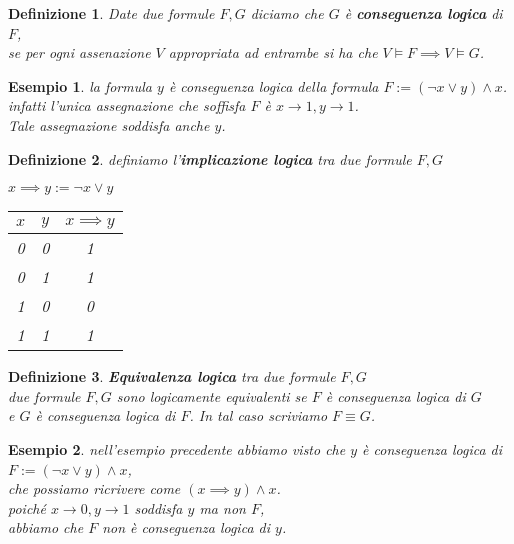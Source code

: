 \documentclass[a4paper,12pt]{article}
\theoremstyle{def}
\newtheorem*{definition}{Definizione}
\theoremstyle{prop}
\theoremstyle{esempio}
\newtheorem*{example}{Esempio}
\theoremstyle{dimostrazione}
\theoremstyle{teo}
\theoremstyle{osservazione}
\begin{document}
\begin{definition}
	Date due formule \(F,G\) diciamo che \(G\) è \textbf{conseguenza logica} di \(F\),\\
	se per ogni assenazione \(V\) appropriata ad entrambe si ha che \(V \vDash F \implies V \vDash G\).
\end{definition}
\begin{example}
	la formula \(y\) è conseguenza logica della formula \(F := (\neg x \lor y) \land x\).\\
	infatti l'unica assegnazione che soffisfa \(F\) è \(x \rightarrow 1, y \rightarrow 1\).\\
	Tale assegnazione soddisfa anche \(y\).
\end{example}
\begin{definition}
	definiamo l'\textbf{implicazione logica} tra due formule \(F,G\)\\
	\begin{center}
		\(x \implies y := \neg x \lor y\)\\
		\begin{tabular}{c|c|c}
			\hline
			\(x\) & \(y\) & \(x \implies y\) \\
			\hline
			0     & 0     & 1                \\
			0     & 1     & 1                \\
			1     & 0     & 0                \\
			1     & 1     & 1                \\
		\end{tabular}
	\end{center}
\end{definition}
\begin{definition}
	\textbf{Equivalenza logica} tra due formule \(F,G\)\\
	due formule \(F,G\) sono logicamente equivalenti se \(F\) è conseguenza logica di \(G\)\\
	e \(G\) è conseguenza logica di \(F\). In tal caso scriviamo \(F \equiv G\).
\end{definition}
\begin{example}
	nell'esempio precedente abbiamo visto che \(y\) è conseguenza logica di \(F:= (\neg x \lor y) \land x \),\\
	che possiamo ricrivere come \((x \implies y) \land x\).\\
	poiché \(x \rightarrow 0, y \rightarrow 1\) soddisfa \(y\) ma non \(F\),\\
	abbiamo che \(F\) non è conseguenza logica di \(y\).\\
\end{example}
\end{document}
